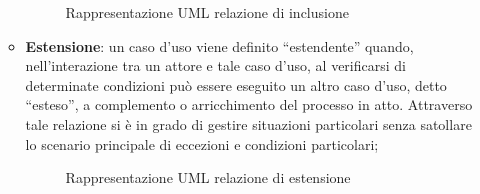 \begin{itemize}
\begin{itemize}
            \begin{figure}[H]
                \centering
                \caption{Rappresentazione UML relazione di inclusione}
                \label{fig:Rappresentazione UML relazione di inclusione}
            \end{figure}
        \item \textbf{Estensione}: un caso d'uso viene definito ``estendente'' quando, nell'interazione tra un attore e tale caso d'uso, al verificarsi di determinate condizioni può essere eseguito un altro caso d'uso, detto ``esteso'', a complemento o arricchimento del processo in atto. Attraverso tale relazione si è in grado di gestire situazioni particolari senza satollare lo scenario principale di eccezioni e condizioni particolari;
            \begin{figure}[H]
                \centering
                \caption{Rappresentazione UML relazione di estensione}
                \label{fig:Rappresentazione UML relazione di estensione}

\end{figure}
\end{itemize}
\end{itemize}
